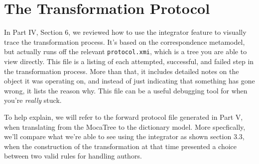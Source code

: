 \newpage

\section{The Transformation Protocol}

\genHeader

In Part IV, Section 6, we reviewed how to use the integrator feature to visually trace the transformation process. It's based on the correspondence metamodel,
but actually runs off the relevant \texttt{protocol.xmi}, which is a tree you are able to view directly. This file is a listing of each attempted, successful,
and failed step in the transformation process. More than that, it includes detailed notes on the object it was operating on, and instead of just indicating that
something has gone wrong, it lists the reason why. This file can be a useful debugging tool for when you're \emph{really} stuck.

To help explain, we will refer to the forward protocol file generated in Part V, when translating from the MocaTree to the dictionary model. More
specfically, we'll compare what we're able to see using the integrator as shown section 3.3, when the construction of the transformation at that time presented
a choice between two valid rules for handling authors.

